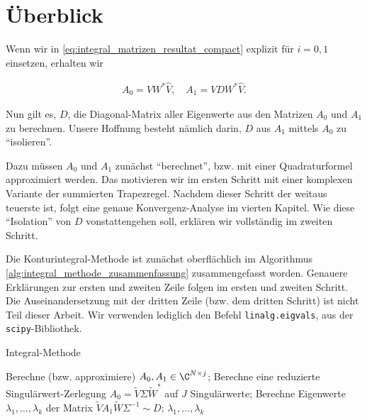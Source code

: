 \section{Überblick}

Wenn wir in \eqref{eq:integral_matrizen_resultat_compact} explizit für $i = 0, 1$ einsetzen, erhalten wir

\begin{align} \label{eq:integral_matrizen_resultat}
    A_0 = V W^\ast \hat V,
    \quad
    A_1 = V D W^\ast \hat V.
\end{align}

Nun gilt es, $D$, die Diagonal-Matrix aller Eigenwerte aus den Matrizen $A_0$ und $A_1$ zu berechnen.
Unsere Hoffnung besteht nämlich darin, $D$ aus $A_1$ mittels $A_0$ zu \enquote{isolieren}.

Dazu müssen $A_0$ und $A_1$ zunächst \enquote{berechnet}, bzw. mit einer Quadraturformel approximiert werden.
Das motivieren wir im ersten Schritt mit einer komplexen Variante der summierten Trapezregel.
Nachdem dieser Schritt der weitaus teuerste ist, folgt eine genaue Konvergenz-Analyse im vierten Kapitel.
Wie diese \enquote{Isolation} von $D$ vonstattengehen soll, erklären wir vollständig im zweiten Schritt.

Die Konturintegral-Methode ist zunächst oberflächlich im Algorithmus \ref{alg:integral_methode_zusammenfassung} zusammengefasst worden.
Genauere Erklärungen zur ersten und zweiten Zeile folgen im ersten und zweiten Schritt.
Die Auseinandersetzung mit der dritten Zeile (bzw. dem dritten Schritt) ist nicht Teil dieser Arbeit.
Wir verwenden lediglich den Befehl \texttt{linalg.eigvals}, aus der \texttt{scipy}-Bibliothek.

\begin{algorithm}[H]
	\caption{Integral-Methode}
    \begin{algorithmic}[0]
          \State Berechne (bzw. approximiere) $A_0, A_1 \in \C^{N \times j}$;
          \State Berechne eine reduzierte Singulärwert-Zerlegung $A_0 = \tilde V \Sigma \tilde W^\ast$ auf $J$ Singulärwerte;
          \State Berechne Eigenwerte $\lambda_1, \dots, \lambda_k$ der Matrix $\tilde V A_1 \tilde W \Sigma^{-1} \sim D$;
          \State \Return $\lambda_1, \dots, \lambda_k$
    \end{algorithmic}
    \label{alg:integral_methode_zusammenfassung}
\end{algorithm}
